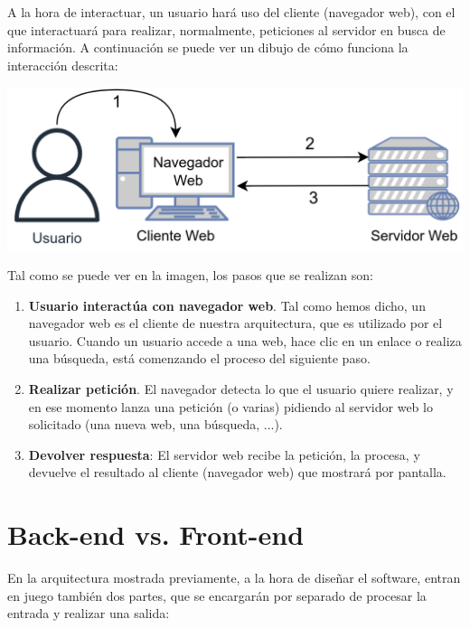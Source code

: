 \documentclass{\ClassPath/viu-tfm-template}
\begin{document}
A la hora de interactuar, un usuario hará uso del cliente (navegador web), con el que interactuará para realizar, normalmente, peticiones al servidor en busca de información. A continuación se puede ver un dibujo de cómo funciona la interacción descrita:


\begin{center}
    \includegraphics[width=0.6\linewidth]{img/cliente_servidor.png}
\end{center}

Tal como se puede ver en la imagen, los pasos que se realizan son:

\begin{enumerate}
    \item \textbf{Usuario interactúa con navegador web}. Tal como hemos dicho, un navegador web es el cliente de nuestra arquitectura, que es utilizado por el usuario. Cuando un usuario accede a una web, hace clic en un enlace o realiza una búsqueda,  está comenzando el proceso del siguiente paso.

    \item \textbf{Realizar petición}. El navegador detecta lo que el usuario quiere realizar, y en ese momento lanza una petición (o varias) pidiendo al servidor web lo solicitado (una nueva web, una búsqueda, ...).

    \item \textbf{Devolver respuesta}: El servidor web recibe la petición, la procesa, y devuelve el resultado al cliente (navegador web) que mostrará por pantalla.
\end{enumerate}

\section{Back-end vs. Front-end}
En la arquitectura mostrada previamente, a la hora de diseñar el software, entran en juego también dos partes, que se encargarán por separado de procesar la entrada y realizar una salida:
\end{document}
